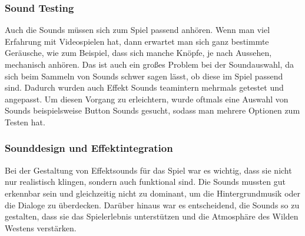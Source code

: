 \subsubsection{Sound Testing}\label{subsubsec:Sound-Testing}
Auch die Sounds müssen sich zum Spiel passend anhören. Wenn man viel Erfahrung mit Videospielen hat, dann erwartet man sich ganz bestimmte Geräusche, wie zum Beispiel, dass sich manche Knöpfe, je nach Aussehen, mechanisch anhören.
Das ist auch ein großes Problem bei der Soundauswahl, da sich beim Sammeln von Sounds schwer sagen lässt, ob diese im Spiel passend sind. Dadurch wurden auch Effekt Sounds teamintern mehrmals getestet und angepasst.
Um diesen Vorgang zu erleichtern, wurde oftmals eine Auswahl von Sounds beispielsweise Button Sounds gesucht, sodass man mehrere Optionen zum Testen hat.

\subsubsection{Sounddesign und Effektintegration}\label{subsubsec:Sounddesign}
Bei der Gestaltung von Effektsounds für das Spiel war es wichtig, dass sie nicht nur realistisch klingen, sondern auch funktional sind. Die Sounds mussten gut erkennbar sein und gleichzeitig nicht zu dominant, um die Hintergrundmusik oder die Dialoge zu überdecken.
Darüber hinaus war es entscheidend, die Sounds so zu gestalten, dass sie das Spielerlebnis unterstützen und die Atmosphäre des Wilden Westens verstärken.
%

\renewcommand{\kapitelautor}{}
